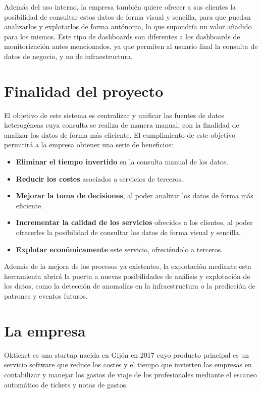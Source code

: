 Además del uso interno, la empresa también quiere ofrecer a sus clientes la posibilidad de
consultar estos datos de forma visual y sencilla, para que puedan analizarlos y explotarlos de
forma autónoma, lo que supondría un valor añadido para los mismos. Este tipo de dashboards
son diferentes a los dashboards de monitorización antes mencionados, ya que permiten al usuario
final la consulta de datos de negocio, y no de infraestructura.

\section{Finalidad del proyecto}\label{sec:finalidad}
El objetivo de este sistema es centralizar y unificar las fuentes de datos heterogéneas
cuya consulta se realiza de manera manual, con la finalidad de analizar los datos de forma
más eficiente. El cumplimiento de este objetivo permitirá a la empresa obtener una serie de
beneficios:
\begin{itemize}[noitemsep]
	\item \textbf{Eliminar el tiempo invertido} en la consulta manual de los datos.
	\item \textbf{Reducir los costes} asociados a servicios de terceros.
	\item \textbf{Mejorar la toma de decisiones}, al poder analizar los datos de forma más eficiente.
	\item \textbf{Incrementar la calidad de los servicios} ofrecidos a los clientes, al poder ofrecerles
	      la posibilidad de consultar los datos de forma visual y sencilla.
	\item \textbf{Explotar económicamente} este servicio, ofreciéndolo a terceros.
\end{itemize}

Además de la mejora de los procesos ya existentes, la explotación mediante esta herramienta
abrirá la puerta a nuevas posibilidades de análisis y explotación de los datos, como la detección
de anomalías en la infraestructura o la predicción de patrones y eventos futuros.

\section{La empresa}\label{sec:empresa}
Okticket es una startup nacida en Gijón en 2017 cuyo producto principal es un servicio software
que reduce los costes y el tiempo que invierten las empresas en contabilizar y manejar los gastos
de viaje de los profesionales mediante el escaneo automático de tickets y notas de gastos.

